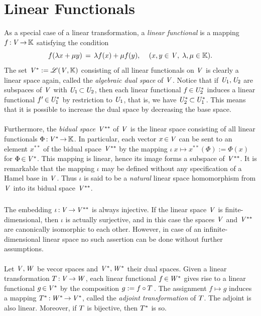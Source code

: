 \documentclass[11pt,twoside]{article}
\begin{document}
\section{Linear Functionals}
As a special case of a linear trans\-formation,
a \textit{linear functional} is a mapping $f {\,:\,}\mathit{V} {\,\to\,} {\mathbb{K}}$
satisfying the condition
\[
f(\lambda x + \mu y) \,=\, \lambda f(x) + \mu f(y),
\quad \,
(x,y \in \mathit{V}, \; \lambda,\mu \in {\mathbb{K}}).
\]
The set $\mathit{V}^* := \mathscr{L}(\mathit{V},{\mathbb{K}})$ consisting of all linear functionals
on $\mathit{V}$ is clearly a linear space again,
called the \textit{algebraic dual space} of $\mathit{V}$.
Notice
that if $\mathit{U}_1,\mathit{U}_2$ are subspaces of $\mathit{V}$ with
$\mathit{U}_1 {\,\subset\,} \mathit{U}_2$,
then each linear functional $f {\,\in\,} \mathit{U}_2^*$ induces
a linear functional $f' {\,\in\,} \mathit{U}_1^*$ by restriction to $\mathit{U}_1$,
that is, we have $\mathit{U}_2^* {\,\subset\,} \mathit{U}_1^*$.
This means
that it is possible to increase the dual space by decreasing the base space.

\paragraph{}
Furthermore,
the \textit{bidual space} $\mathit{V}^{**}$ of $\mathit{V}$ is the linear space
consisting of all linear functionals $\Phi {\,:\,}\mathit{V}^* {\,\to\,} {\mathbb{K}}$.
In particular,
each vector $x {\,\in\,} \mathit{V}$ can be sent to an element $x^{**}$
of the bidual space $\mathit{V}^{**}$ by the mapping
$\iota \: x \mapsto x^{**}(\Phi) := \Phi(x)$ for $\Phi {\,\in\,} \mathit{V}^*$.
This mapping is linear,
hence its image forms a subspace of $\mathit{V}^{**}$.
It is remarkable
that the mapping $\iota$ may be defined without any specification
of a Hamel base in $\mathit{V}$.
Thus $\iota$ is said to be a \textit{natural} linear space homomorphism
from $\mathit{V}$ into its bidual space $\mathit{V}^{**}$.

\subparagraph{}
The embedding $\iota {\,:\,}\mathit{V} {\,\to\,} \mathit{V}^{**}$ is always injective.
If the linear space $\mathit{V}$ is finite-dimensional,
then $\iota$ is actually surjective,
and in this case
the spaces $\mathit{V}$ and $\mathit{V}^{**}$ are canonically isomorphic to each other.
However,
in case of an infinite-dimensional linear space
no such assertion can be done without further assumptions.

\paragraph{}
Let $\mathit{V}, \mathit{W}$ be vecor spaces and $\mathit{V}^*, \mathit{W}^*$ their
dual spaces.
Given a linear trans\-formation ${T} {\,:\,}\mathit{V} {\,\to\,} \mathit{W}$,
each linear functional $f {\,\in\,} \mathit{W}^*$ gives rise to
a linear functional $g {\,\in\,} \mathit{V}^*$ by the composition $g:= f \circ {T}\,$.
The assignment $f \mapsto g$ induces a mapping
${T}^* {\,:\,}\mathit{W}^* {\,\to\,} \mathit{V}^*$,
called the \textit{adjoint trans\-formation} of ${T}$.
The adjoint is also linear.
Moreover,
if ${T}$ is bijective, then ${T}^*$ is so.
\end{document}
